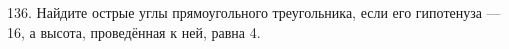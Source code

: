 136. Найдите острые углы прямоугольного треугольника, если его гипотенуза --- 16, а высота, проведённая к ней, равна 4.\\
